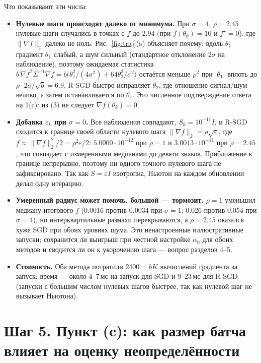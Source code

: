 \documentclass[11pt,a4paper]{article}
\newcommand{\norm}[1]{\lVert #1\rVert_2}
\begin{document}
Что показывают эти числа:
\begin{itemize}
\item \textbf{Нулевые шаги происходят далеко от минимума.} При $\sigma=4$,
$\rho=2.45$ нулевые шаги случались в точках с $f$ до $2.94$ (при $f(\theta_0)=10$ и
$f^\star=0$), где $\norm{\nabla f}$ далеко не ноль. Рис.~\ref{fig:traj}(a) объясняет
почему: вдоль $\theta_1$ градиент $\theta_1$ слабый, а шум сильный (стандартное
отклонение $2\sigma$ на наблюдение), поэтому ожидаемая статистика
$b\,\nabla f^T\Sigma^{-1}\nabla f=b\big(\theta_1^2/(4\sigma^2)+64\theta_2^2/\sigma^2\big)$
остаётся меньше $\rho^2$ при $|\theta_1|$ вплоть до $\rho\cdot2\sigma/\sqrt b=6.9$.
R-SGD быстро исправляет $\theta_2$, где отношение сигнал/шум велико, а затем
останавливается по $\theta_1$. Это численное подтверждение ответа на 1(c): из (3) не
следует $\nabla f(\theta_k)=0$.
\item \textbf{Добавка $\varepsilon_k$ при $\sigma=0$.} Все наблюдения совпадают,
$S_k=10^{-11}I$, и R-SGD сходится к границе своей области нулевого шага
$\norm{\nabla f}=\rho\sqrt{\varepsilon}$, где
$f\approx\norm{\nabla f}^2/2=\rho^2\varepsilon/2$: $5.0000\cdot10^{-12}$ при $\rho=1$
и $3.0013\cdot10^{-11}$ при $\rho=2.45$, что совпадает с измеренными медианами до
девяти знаков. Приближение к границе непрерывно, поэтому ни одного точного нулевого шага
не зафиксировано. Так как $S=\varepsilon I$ изотропна, Ньютон на каждом обновлении
делал одну итерацию.
\item \textbf{Умеренный радиус может помочь, большой — тормозит.} $\rho=1$ уменьшил
медиану итогового $f$ (0.0016 против 0.0034 при $\sigma=1$; 0.026 против 0.054 при
$\sigma=4$), но интерквартильные размахи перекрываются, а $\rho=2.45$ оказался хуже SGD
при обоих уровнях шума. Это ненастроенные иллюстративные запуски; сохранится ли выигрыш
при честной настройке $\alpha_0$ для обоих методов и сводится ли он к укорочению шага —
вопрос разделов 4--5.
\item \textbf{Стоимость.} Оба метода потратили $2400=bK$ вычислений градиента за
запуск; время — около 4--7\,мс на запуск для SGD и 9--23\,мс для R-SGD (запуски с
большим числом нулевых шагов быстрее, так как нулевой шаг не вызывает Ньютона).
\end{itemize}

\section*{Шаг 5. Пункт (c): как размер батча влияет на оценку неопределённости}
\end{document}
